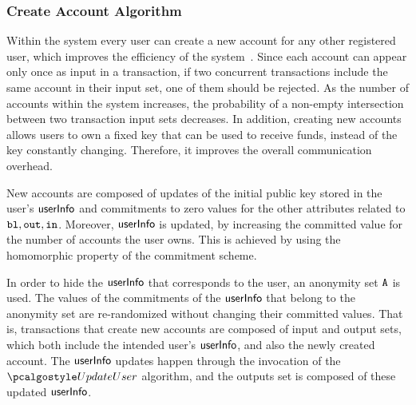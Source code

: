 \subsubsection{Create Account Algorithm}
Within the system every user can create a new account for any other registered user, which improves the efficiency of the system~\cite{fauzi2019quisquis}.
Since each account can appear only once as input in a transaction, if two concurrent transactions include the same account in their input set, one of them should be rejected.
As the number of accounts within the system increases, the probability of a non-empty intersection between two transaction input sets decreases. 
In addition, creating new accounts allows users to own a fixed key that can be used to receive funds, instead of the key constantly changing. %
Therefore, it improves the overall communication overhead.


New accounts are composed of updates of the initial public key stored in the user's $\textup{\textsf{userInfo}}$ and commitments to zero values for the other attributes related to $\textup{\texttt{{bl}}}, \textup{\texttt{{out}}}, \textup{\texttt{{in}}}$. Moreover, $\textup{\textsf{userInfo}}$ is updated, by increasing the committed value for the number of accounts the user owns. This is achieved by using the homomorphic property of the commitment scheme. 

In order to hide the $\textup{\textsf{userInfo}}$ that corresponds to the user, an anonymity set ${\mathtt{A}}$ is used. The values of the commitments of the $\textup{\textsf{userInfo}}$ that belong to the anonymity set are re-randomized without changing their committed values. That is, transactions that create new accounts are composed of input and output sets, which both include the intended user's $\textup{\textsf{userInfo}}$, and also the newly created account. The $\textup{\textsf{userInfo}}$ updates happen through the invocation of the $\upduser$ algorithm, and the outputs set is composed of these updated $\textup{\textsf{userInfo}}$.

